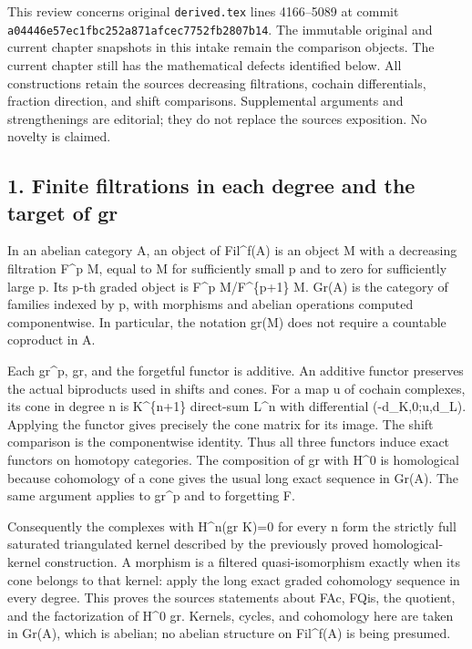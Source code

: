\documentclass[11pt]{article}
\begin{document}
This review concerns original \texttt{derived.\allowbreak{}tex} lines 4166–\allowbreak{}5089 at commit \texttt{a04446e5\allowbreak{}7ec1fbc2\allowbreak{}52a871af\allowbreak{}cec7752f\allowbreak{}b2807b14}. The immutable original and current chapter snapshots in this intake remain the comparison objects. The current chapter still has the mathematical defects identified below. All constructions retain the source\textquotesingle s decreasing filtrations,\allowbreak{} cochain differentials,\allowbreak{} fraction direction,\allowbreak{} and shift comparisons. Supplemental arguments and strengthenings are editorial; they do not replace the source\textquotesingle s exposition. No novelty is claimed.

\subsection{1. Finite filtrations in each degree and the target of gr}\label{proofs-4166-5089-finite-filtrations-in-each-degree-and-the-target-of-gr}

In an abelian category A,\allowbreak{} an object of Fil\textasciicircum{}f(A)\allowbreak{} is an object M with a decreasing filtration F\^{}p M,\allowbreak{} equal to M for sufficiently small p and to zero for sufficiently large p. Its p-th graded object is F\^{}p M/\allowbreak{}F\textasciicircum{}\{p\allowbreak{}+1\} M. Gr(A)\allowbreak{} is the category of families indexed by p,\allowbreak{} with morphisms and abelian operations computed componentwise. In particular,\allowbreak{} the notation gr(M)\allowbreak{} does not require a countable coproduct in A.

Each gr\textasciicircum{}p,\allowbreak{} gr,\allowbreak{} and the forgetful functor is additive. An additive functor preserves the actual biproducts used in shifts and cones. For a map u of cochain complexes,\allowbreak{} its cone in degree n is K\textasciicircum{}\{n\allowbreak{}+1\} direct-sum L\^{}n with differential (-d\_\allowbreak{}K,\allowbreak{}0;u,\allowbreak{}d\_\allowbreak{}L)\allowbreak{}. Applying the functor gives precisely the cone matrix for its image. The shift comparison is the componentwise identity. Thus all three functors induce exact functors on homotopy categories. The composition of gr with H\^{}0 is homological because cohomology of a cone gives the usual long exact sequence in Gr(A)\allowbreak{}. The same argument applies to gr\^{}p and to forgetting F.

Consequently the complexes with H\^{}n(gr K)\allowbreak{}\allowbreak{}=0 for every n form the strictly full saturated triangulated kernel described by the previously proved homological-kernel construction. A morphism is a filtered quasi-isomorphism exactly when its cone belongs to that kernel:\allowbreak{} apply the long exact graded cohomology sequence in every degree. This proves the source\textquotesingle s statements about FAc,\allowbreak{} FQis,\allowbreak{} the quotient,\allowbreak{} and the factorization of H\^{}0 gr. Kernels,\allowbreak{} cycles,\allowbreak{} and cohomology here are taken in Gr(A)\allowbreak{},\allowbreak{} which is abelian; no abelian structure on Fil\textasciicircum{}f(A)\allowbreak{} is being presumed.
\end{document}
